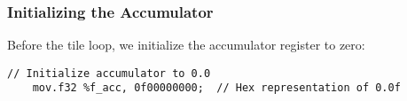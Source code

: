 \subsubsection{Initializing the Accumulator}

Before the tile loop, we initialize the accumulator register to zero:

\begin{lstlisting}[style=ptx]
    // Initialize accumulator to 0.0
    mov.f32 %f_acc, 0f00000000;  // Hex representation of 0.0f
\end{lstlisting}


